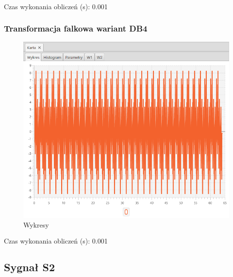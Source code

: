 \documentclass[12pt]{article}
\begin{document}
{{{                Czas wykonania obliczeń (s): 0.001
            }
            \newpage

            \subsubsection{Transformacja falkowa wariant DB4} {

                \begin{figure}[H]
                    \centering
                    \includegraphics[width=\textwidth]{img/result/s1/08/data_draw_8_sinus_sampling_trans_s1_data_205730.png}
                    \caption{Wykresy}
                \end{figure}

                Czas wykonania obliczeń (s): 0.001
            }
            \newpage

        }
        \newpage
        \subsection{Sygnał S2} {

}}
\end{document}
